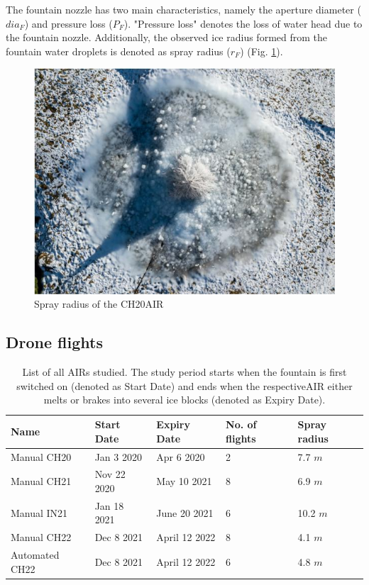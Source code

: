 The fountain nozzle has two main characteristics, namely the aperture diameter ($dia_{F}$) and pressure loss
($P_{F}$). "Pressure loss" denotes the loss of water head due to the fountain nozzle. Additionally,
the observed ice radius formed from the fountain water droplets is denoted as spray radius ($r_F$) (Fig.
\ref{fig:CH20_rad}).

\begin{figure}[htb]
	\centering
	\includegraphics[width=\textwidth/2]{figs/CH20_sprayrad.jpg}
	\caption{Spray radius of the CH20\ac{AIR} }
	\label{fig:CH20_rad}
\end{figure}

\subsection{Drone flights}

\begin{table}
	\centering
	\caption{List of all \ac{AIRs} studied. The study period starts when the fountain is first switched on
		(denoted as Start Date) and ends when the respective\ac{AIR} either melts or brakes into several ice blocks
		(denoted as Expiry Date). }
	\label{tab:AIRs}
	\begin{tabular}{|lllll|}
		\hline
		\textbf{Name}    & \textbf{Start Date} & \textbf{Expiry Date} & \textbf{No. of flights} & \textbf{Spray
		radius}                                                                                                 \\ \hline
		Manual CH20 & Jan 3 2020          & Apr 6 2020           & 2                       & 7.7 $m$       \\
		Manual CH21 & Nov 22 2020         & May 10 2021          & 8                       & 6.9 $m$       \\
		Manual IN21 & Jan 18 2021         & June 20 2021         & 6                       & 10.2 $m$      \\
		Manual CH22 & Dec 8 2021          & April 12 2022        & 8                       & 4.1 $m$       \\
		Automated CH22   & Dec 8 2021          & April 12 2022        & 6                       & 4.8 $m$       \\ \hline
	\end{tabular}
\end{table}


